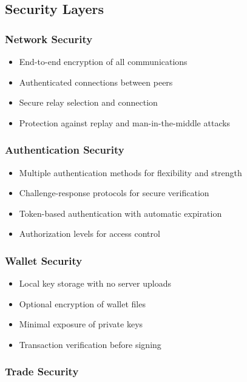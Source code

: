 \documentclass[11pt,a4paper]{article}
\begin{document}
\subsection{Security Layers}

\subsubsection{Network Security}

\begin{itemize}
    \item End-to-end encryption of all communications
    \item Authenticated connections between peers
    \item Secure relay selection and connection
    \item Protection against replay and man-in-the-middle attacks
\end{itemize}

\subsubsection{Authentication Security}

\begin{itemize}
    \item Multiple authentication methods for flexibility and strength
    \item Challenge-response protocols for secure verification
    \item Token-based authentication with automatic expiration
    \item Authorization levels for access control
\end{itemize}

\subsubsection{Wallet Security}

\begin{itemize}
    \item Local key storage with no server uploads
    \item Optional encryption of wallet files
    \item Minimal exposure of private keys
    \item Transaction verification before signing
\end{itemize}

\subsubsection{Trade Security}
\end{document}
